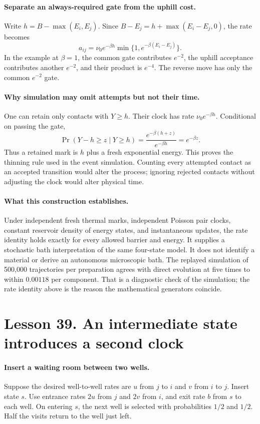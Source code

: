 \documentclass[11pt]{article}
\begin{document}
\paragraph{Separate an always-required gate from the uphill cost.}
Write $h=B-\max(E_i,E_j)$. Since
$B-E_j=h+\max(E_i-E_j,0)$, the rate becomes
\[
 a_{ij}=\nu_0e^{-\beta h}\min\{1,e^{-\beta(E_i-E_j)}\}.
\]
In the example at $\beta=1$, the common gate contributes $e^{-2}$,
the uphill acceptance contributes another $e^{-2}$, and their product is
$e^{-4}$. The reverse move has only the common $e^{-2}$ gate.

\paragraph{Why simulation may omit attempts but not their time.}
One can retain only contacts with $Y\geq h$. Their clock has rate
$\nu_0e^{-\beta h}$. Conditional on passing the gate,
\[
 \Pr(Y-h\geq z\mid Y\geq h)
 =\frac{e^{-\beta(h+z)}}{e^{-\beta h}}=e^{-\beta z}.
\]
Thus a retained mark is $h$ plus a fresh exponential energy. This proves
the thinning rule used in the event simulation. Counting every attempted
contact as an accepted transition would alter the process; ignoring
rejected contacts without adjusting the clock would alter physical time.

\paragraph{What this construction establishes.}
Under independent fresh thermal marks, independent Poisson pair clocks,
constant reservoir density of energy states, and instantaneous updates,
the rate identity holds exactly for every allowed barrier and energy.
It supplies a stochastic bath interpretation of the same four-state model.
It does not identify a material or derive an autonomous microscopic bath.
The replayed simulation of 500,000 trajectories per preparation agrees
with direct evolution at five times to within $0.00118$ per component.
That is a diagnostic check of the simulation; the rate identity above is
the reason the mathematical generators coincide.

\section*{Lesson 39. An intermediate state introduces a second clock}
\paragraph{Insert a waiting room between two wells.}
Suppose the desired well-to-well rates are $u$ from $j$ to $i$ and $v$
from $i$ to $j$. Insert state $s$. Use entrance rates $2u$ from $j$
and $2v$ from $i$, and exit rate $b$ from $s$ to each well. On entering
$s$, the next well is selected with probabilities $1/2$ and $1/2$.
Half the visits return to the well just left.
\end{document}
